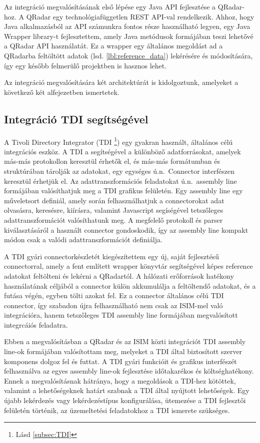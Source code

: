 Az integráció megvalósításának első lépése egy Java API fejlesztése a QRadar-hoz. A QRadar egy technológiafüggetlen REST API-val rendelkezik. Ahhoz, hogy Java alkalmazásból az API számunkra fontos része használható legyen, egy Java Wrapper library-t fejlesztettem, amely Java metódusok formájában teszi lehetővé a QRadar API használatát. Ez a wrapper egy általános megoldást ad a QRadarba feltöltött adatok (lsd. \ref{lbl:reference_data}) lekérésére és módosítására, így egy később felmerülő projektben is hasznos lehet.

Az integráció megvalósítására két architektúrát is kidolgoztunk, amelyeket a következő két alfejezetben ismertetek.

\subsection{Integráció TDI segítségével}

A Tivoli Directory Integrator (TDI \footnote[3]{\label{foot:TDI}Lásd \ref{subsec:TDI} }) egy gyakran használt, általános célú integrációs eszköz. 
A TDI a segítségével a különböző adatforrásokat, amelyek más-más protokollon keresztül érhetők el, és más-más formátumban és struktúrában tárolják az adatokat, egy egységes ú.n.~Connector interfészen keresztül érhetjük el. Az adattranszformációs feladatokat ú.n.~assembly line formájában valósíthatjuk meg a TDI grafikus felületén. Egy assembly line egy műveletsort definiál, amely során felhasználhatjuk a connectorokat adat olvasásra, keresésre, kiírásra, valamint Javascript segíségével tetszőleges adattranszformációt valósíthatunk meg. A megfelelő protokoll és parser kiválasztásáról a használt connector gondoskodik, így az assembly line kompakt módon csak a valódi adattranszformációt definiálja. 

A TDI gyári connectorkészletét kiegészítettem egy új, saját fejlesztésű connectorral, amely a fent említett wrapper könyvtár segítségével képes reference adatokat feltölteni és lekérni a QRadartól. A hálózati erőforrások hatékony használatának céljából a connector külön akkumulálja a feltöltendő adatokat, és a futása végén, egyben tölti azokat fel. Ez a connector általános célú TDI connector, így szabadon újra felhasználható nem csak az ISIM-mel való integrációra, hanem tetszőleges TDI assembly line formájában megvalósított integrcáiós feladatra. 

Ebben a megvalósításban a QRadar és az ISIM közti integrációt TDI assembly line-ok formájában valósítottam meg, melyeket a TDI által biztosított szerver komponens dolgoz fel és futtat. A TDI gyári funkcióit és grafikus interfészét felhasználva az egyes assembly line-ok fejlesztése időtakarékos és költséghatékony. Ennek a megvalósításnak hátránya, hogy a megoldások a TDI-hez kötöttek, valamint a lehetőségeknek határt szabnak a TDI által nyújtott lehetőségek. Egy újabb lekérdezés vagy lekérdezéstípus konfigurálása, ütemezése a TDI fejlesztői felületén történik, az üzemeltetési feladatokhoz a TDI ismerete szükséges.


